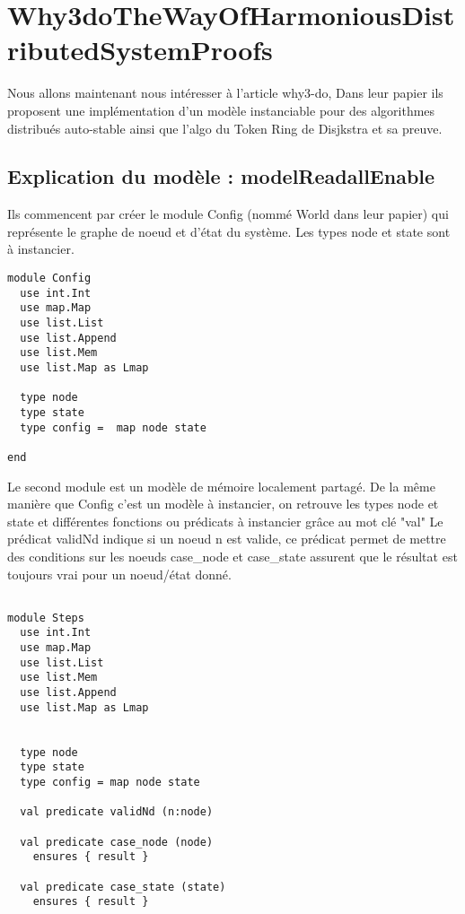 \documentclass[11pt]{article}
\begin{document}
\section{Why3doTheWayOfHarmoniousDistributedSystemProofs}
\label{sec:org518bbeb}

Nous allons maintenant nous intéresser à l'article why3-do, 
Dans leur papier ils proposent une implémentation d'un modèle instanciable pour des algorithmes
distribués auto-stable ainsi que l'algo du Token Ring de Disjkstra et sa preuve.

\subsection{Explication du modèle : modelReadallEnable}
\label{sec:org8bc8ce1}

Ils commencent par créer le module Config (nommé World dans leur papier) qui représente le graphe de noeud et d'état du système.
Les types node et state sont à instancier.  

\begin{verbatim}
module Config
  use int.Int
  use map.Map
  use list.List
  use list.Append
  use list.Mem
  use list.Map as Lmap

  type node
  type state
  type config =  map node state

end

\end{verbatim}

Le second module est un modèle de mémoire localement partagé.
De la même manière que Config c'est un modèle à instancier,
on retrouve les types node et state et différentes fonctions ou prédicats à instancier grâce au mot clé "val" 
Le prédicat validNd indique si un noeud n est valide, ce prédicat permet de mettre des conditions sur les noeuds 
case\_node et case\_state assurent que le résultat est toujours vrai pour un noeud/état donné.
\begin{verbatim}

module Steps
  use int.Int
  use map.Map
  use list.List
  use list.Mem
  use list.Append
  use list.Map as Lmap


  type node
  type state
  type config = map node state

  val predicate validNd (n:node)

  val predicate case_node (node)
    ensures { result }

  val predicate case_state (state)
    ensures { result }

\end{verbatim}
\end{document}
